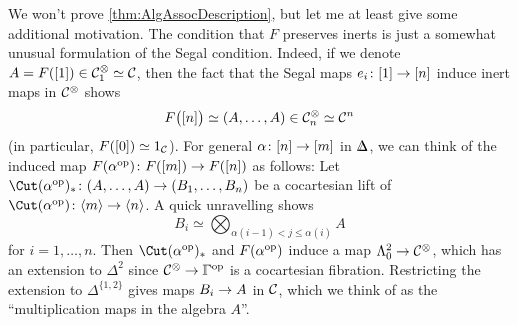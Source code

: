 \begin{rem*}\label{rem*:AlgAssocDescription}
	We won't prove \cref{thm:AlgAssocDescription}, but let me at least give some additional motivation. The condition that $F$ preserves inerts is just a somewhat unusual formulation of the Segal condition. Indeed, if we denote $A=F([1])\in \mathcal{C}_1^\otimes\simeq \mathcal{C}$, then the fact that the Segal maps $e_i\colon [1]\morphism {[n]}$ induce inert maps in $\mathcal{C}^\otimes$ shows
	\begin{equation*}
		F\big([n]\big)\simeq (A,\dotsc,A)\in\mathcal{C}_n^\otimes\simeq \mathcal{C}^n
	\end{equation*}
	(in particular, $F([0])\simeq 1_{\mathcal{C}}$). For general $\alpha\colon [n]\morphism{[m]}$ in $\IDelta$, we can think of the induced map $F(\alpha^\op)\colon F([m])\morphism F([n])$ as follows: Let $\Cut(\alpha^\op)_*\colon (A,\dotsc,A)\morphism (B_1,\dotsc,B_n)$ be a cocartesian lift of $\Cut(\alpha^\op)\colon \langle m\rangle\morphism\langle n\rangle$. A quick unravelling shows
	\begin{equation*}
		B_i\simeq \bigotimes_{\alpha(i-1)<j\leq \alpha(i)}A
	\end{equation*}
	for $i=1,\dotsc,n$. Then $\Cut(\alpha^\op)_*$ and $F(\alpha^{\mathrm{op}})$ induce a map $\Lambda_0^2\morphism \Cc^\otimes$, which has an extension to $\Delta^2$ since $\Cc^\otimes\morphism \IGamma^\op$ is a cocartesian fibration. Restricting the extension to $\Delta^{\{1,2\}}$ gives maps $B_i\morphism A$ in $\mathcal{C}$, which we think of as the \enquote{multiplication maps in the algebra $A$}.
\end{rem*}


